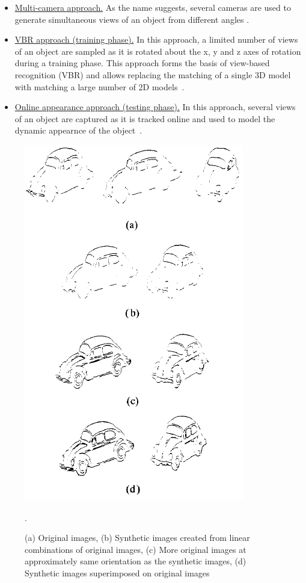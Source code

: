 \begin{itemize}
\item \underline{Multi-camera approach.}  As the name suggests, several cameras are used to generate simultaneous views of an object from different angles \cite{2000_JNL_EasyLiv_Krumm}.  
\item \underline{VBR approach (training phase).}  In this approach, a limited number of views of an object are sampled as it is rotated about the x, y and z axes of rotation during a training phase.  This approach forms the basis of view-based recognition (VBR) and allows replacing the matching of a single 3D model with matching a large number of 2D models~\cite{1992_JNL_VBR_Breuel, 1993_CNF_Gestures_Darrell}.
\item \underline{Online appearance approach (testing phase).}  In this approach, several views of an object are captured as it is tracked online and used to model the dynamic appearnce of the object~\cite{2008_JNL_subspaceTRK_Ross}.
\end{itemize}
								\begin{figure}[t]
								\center
								\includegraphics[height=0.6\textheight]{thesis/1991_JNL_TRKsub_Ullman_fig3.png}
								\caption{(a) Original images, (b) Synthetic images created from linear combinations of original images, (c) More original images at approximately same orientation as the synthetic images, (d) Synthetic images superimposed on original images~\cite{1991_JNL_Recog_Ullman}}.
								\label{fig:1991_JNL_TRKsub_Ullman_fig3}
								\end{figure}

